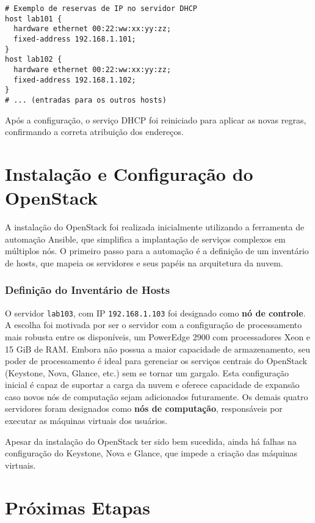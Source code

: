 \begin{verbatim}
# Exemplo de reservas de IP no servidor DHCP
host lab101 {
  hardware ethernet 00:22:ww:xx:yy:zz;
  fixed-address 192.168.1.101;
}
host lab102 {
  hardware ethernet 00:22:ww:xx:yy:zz;
  fixed-address 192.168.1.102;
}
# ... (entradas para os outros hosts)
\end{verbatim}

Após a configuração, o serviço DHCP foi reiniciado para aplicar as novas regras, confirmando a correta atribuição dos endereços.

\section{Instalação e Configuração do OpenStack}

A instalação do OpenStack foi realizada inicialmente utilizando a ferramenta de automação Ansible, que simplifica a implantação de serviços complexos em múltiplos nós. O primeiro passo para a automação é a definição de um inventário de hosts, que mapeia os servidores e seus papéis na arquitetura da nuvem.

\subsubsection*{Definição do Inventário de Hosts}
O servidor \texttt{lab103}, com IP \texttt{192.168.1.103} foi designado como \textbf{nó de controle}. A escolha foi motivada por ser o servidor com a configuração de processamento mais robusta entre os disponíveis, um PowerEdge 2900 com processadores Xeon e 15 GiB de RAM. Embora não possua a maior capacidade de armazenamento, seu poder de processamento é ideal para gerenciar os serviços centrais do OpenStack (Keystone, Nova, Glance, etc.) sem se tornar um gargalo. Esta configuração inicial é capaz de suportar a carga da nuvem e oferece capacidade de expansão caso novos nós de computação sejam adicionados futuramente. Os demais quatro servidores foram designados como \textbf{nós de computação}, responsáveis por executar as máquinas virtuais dos usuários.

Apesar da instalação do OpenStack ter sido bem sucedida, ainda há falhas na configuração do Keystone, Nova e Glance, que impede a criação das máquinas virtuais.

\section{Próximas Etapas}

